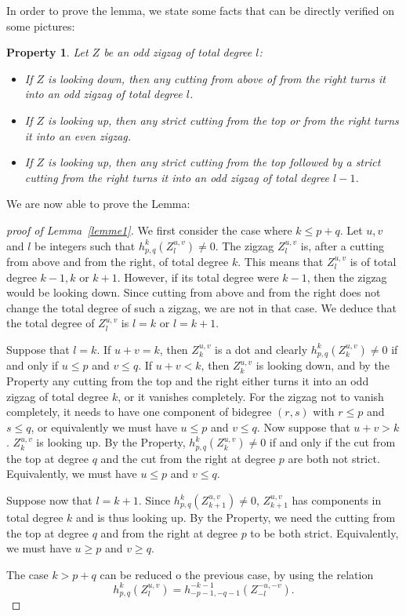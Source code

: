 \documentclass[leqno]{article}
\newtheorem{Property}[equation]{Property}
\theoremstyle{definition}
\numberwithin{equation}{section}
\begin{document}
In order to prove the lemma, we state some facts that can be directly verified on some pictures:
\begin{Property}
Let $Z$ be an odd zigzag of total degree $l$:
\begin{itemize}
\item If $Z$ is looking down, then any cutting from above of from the right turns it into an odd zigzag of total degree $l$.
\item If $Z$ is looking up, then any strict cutting from the top or from the right turns it into an even zigzag.
\item If $Z$ is looking up, then any strict cutting from the top followed by a strict cutting from the right turns it into an odd zigzag of total degree $l-1$.
\end{itemize}
\end{Property}
We are now able to prove the Lemma:
\begin{proof}[proof of Lemma~\ref{lemme1}]
We first consider the case where $k \leqslant p+q$. Let $u, v$ and $l$ be integers such that $h^k_{p, q}(Z_l^{u, v}) \neq 0$. The zigzag $Z_l^{u, v}$ is, after a cutting from above and from the right, of total degree $k$. This means that $Z_{l}^{u, v}$ is of total degree $k-1, k$ or $k+1$. However, if its total degree were $k-1$, then the zigzag would be looking down. Since cutting from above and from the right does not change the total degree of such a zigzag, we are not in that case. We deduce that the total degree of $Z_l^{u, v}$ is $l = k$ or $l = k+1$.

Suppose that $l = k$. If $u+v = k$, then $Z^{u, v}_k$ is a dot and clearly $h^k_{p, q}(Z^{u, v}_k) \neq 0$ if and only if $u \leqslant p$ and $v \leqslant q$. If $u+v < k$, then $Z^{u, v}_k$ is looking down, and by the Property any cutting from the top and the right either turns it into an odd zigzag of total degree $k$, or it vanishes completely. For the zigzag not to vanish completely, it needs to have one component of bidegree $(r, s)$ with $r\leqslant p$ and $s \leqslant q$, or equivalently we must have $u \leqslant p$ and $v \leqslant q$. Now suppose that $u+v > k$. $Z^{u, v}_k$ is looking up. By the Property, $h^k_{p, q}(Z^{u, v}_k) \neq 0$ if and only if the cut from the top at degree $q$ and the cut from the right at degree $p$ are both not strict. Equivalently, we must have $u \leqslant p$ and $v \leqslant q$.

Suppose now that $l = k+1$. Since $h^k_{p, q}(Z^{u, v}_{k+1}) \neq 0$, $Z^{u, v}_{k+1}$ has components in total degree $k$ and is thus looking up. By the Property, we need the cutting from the top at degree $q$ and from the right at degree $p$ to be both strict. Equivalently, we must have $u \geqslant p$ and $v \geqslant q$.

The case $k > p+q$ can be reduced o the previous case, by using the relation
\[
h^k_{p, q}(Z^{u, v}_l)
=
h^{-k-1}_{-p-1, -q-1}(Z^{-u,-v}_{-l}).
\]
\end{proof}
\end{document}
